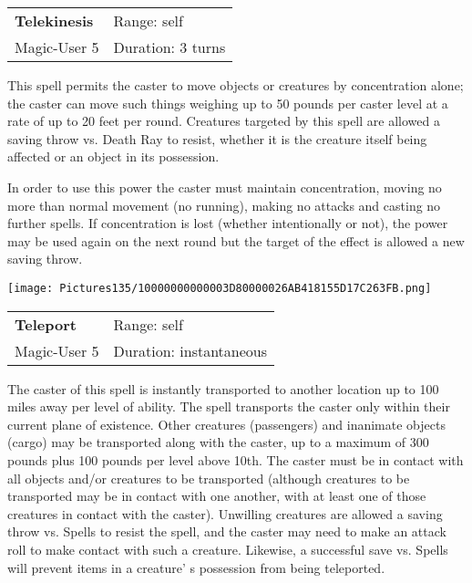 \documentclass[a4paper,twoside,openany,10pt]{book}
\begin{document}
\begin{multicols}{2}
\smallskip\begin{flushleft} 
	\begin{tabularx}{0.45\textwidth}{@{}m{3.5cm}m{5.5cm}@{}} 
		\textbf{Telekinesis} & Range: self\\
Magic-User 5 &Duration: 3 turns\\
	\end{tabularx}\end{flushleft}

This spell permits the caster to move objects or creatures by concentration alone; the caster can move such things weighing up to 50 pounds per caster level at a rate of up to 20 feet per round. Creatures targeted by this spell are allowed a saving throw vs. Death Ray to resist, whether it is the creature itself being affected or an object in its possession.

In order to use this power the caster must maintain concentration, moving no more than normal movement (no running), making no attacks and casting no further spells. If concentration is lost (whether intentionally or not), the power may be used again on the next round but the target of the effect is allowed a new saving throw.

\medskip

\begin{flushleft}
	\texttt{[image: Pictures135/10000000000003D80000026AB418155D17C263FB.png]}
\end{flushleft}

\smallskip\begin{flushleft} 
	\begin{tabularx}{0.45\textwidth}{@{}m{3.5cm}m{5.5cm}@{}} 
		\textbf{Teleport} & Range: self\\
Magic-User 5 &Duration: instantaneous\\
	\end{tabularx}\end{flushleft}

The caster of this spell is instantly transported to another location up to 100 miles away per level of ability. The spell transports the caster only within their current plane of existence. Other creatures (passengers) and inanimate objects (cargo) may be transported along with the caster, up to a maximum of 300 pounds plus 100 pounds per level above 10th. The caster must be in contact with all objects and/or creatures to be transported (although creatures to be transported may be in contact with one another, with at least one of those creatures in contact with the caster). Unwilling creatures are allowed a saving throw vs. Spells to resist the spell, and the caster may need to make an attack roll to make contact with such a creature. Likewise, a successful save vs. Spells will prevent items in a creature' s possession from being teleported.


\end{multicols}
\end{document}
